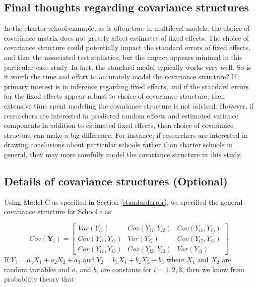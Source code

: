 \documentclass[
]{krantz}
\begin{document}
\hypertarget{final-thoughts-regarding-covariance-structures}{%
\subsection{Final thoughts regarding covariance structures}\label{final-thoughts-regarding-covariance-structures}}

In the charter school example, as is often true in multilevel models, the choice of covariance matrix does not greatly affect estimates of fixed effects. The choice of covariance structure could potentially impact the standard errors of fixed effects, and thus the associated test statistics, but the impact appears minimal in this particular case study. In fact, the standard model typically works very well. So is it worth the time and effort to accurately model the covariance structure? If primary interest is in inference regarding fixed effects, and if the standard errors for the fixed effects appear robust to choice of covariance structure, then extensive time spent modeling the covariance structure is not advised. However, if researchers are interested in predicted random effects and estimated variance components in addition to estimated fixed effects, then choice of covariance structure can make a big difference. For instance, if researchers are interested in drawing conclusions about particular schools rather than charter schools in general, they may more carefully model the covariance structure in this study.

\hypertarget{optionalcov}{%
\subsection{Details of covariance structures (Optional)}\label{optionalcov}}

Using Model C as specified in Section \ref{standarderror}, we specified the general covariance structure for School \(i\) as:

\[ Cov(\mathbf{Y}_i) =  \left[
          \begin{array}{cccc}
            Var(Y_{i1}) & Cov(Y_{i1},Y_{i2}) & Cov(Y_{i1},Y_{i3}) \\
            Cov(Y_{i1},Y_{i2}) & Var(Y_{i2}) & Cov(Y_{i2},Y_{i3}) \\
            Cov(Y_{i1},Y_{i3}) & Cov(Y_{i2},Y_{i3}) & Var(Y_{i3})
          \end{array} \right] \]
If \(Y_1 = a_1 X_1 + a_2 X_2 + a_3\) and \(Y_2 = b_1 X_1 + b_2 X_2 + b_3\) where \(X_1\) and \(X_2\) are random variables and \(a_i\) and \(b_i\) are constants for \(i=1,2,3\), then we know from probability theory that:
\end{document}
